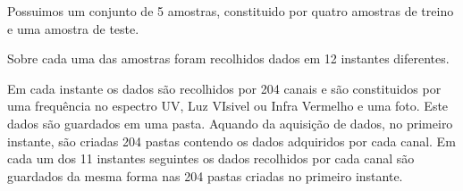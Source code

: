 Possuimos um conjunto de 5 amostras, constituido por quatro amostras de treino e uma amostra de teste.

Sobre cada uma das amostras foram recolhidos dados em 12 instantes diferentes.


Em cada instante os dados são recolhidos por 204 canais e são constituidos por uma frequência no espectro UV, Luz VIsivel ou Infra Vermelho e uma foto. Este dados são guardados em uma pasta. 
Aquando da aquisição de dados, no primeiro instante, são criadas 204 pastas contendo os dados adquiridos por cada canal. Em cada um dos 11 instantes seguintes os dados recolhidos por cada canal são guardados da mesma forma nas 204 pastas criadas no primeiro instante.
